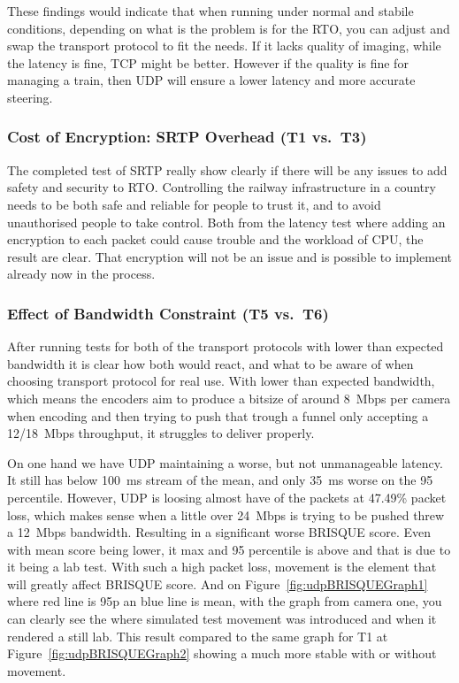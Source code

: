 These findings would indicate that when running under normal and stabile conditions, depending on what is the problem is for the RTO, you can adjust and swap the transport protocol to fit the needs. If it lacks quality of imaging, while the latency is fine, TCP might be better. However if the quality is fine for managing a train, then UDP will ensure a lower latency and more accurate steering.

\subsubsection{Cost of Encryption: SRTP Overhead (T1 vs.\ T3)}\label{subsubsec:srtp}

The completed test of SRTP really show clearly if there will be any issues to add safety and security to RTO. Controlling the railway infrastructure in a country needs to be both safe and reliable for people to trust it, and to avoid unauthorised people to take control. Both from the latency test where adding an encryption to each packet could cause trouble and the workload of CPU, the result are clear. That encryption will not be an issue and is possible to implement already now in the process.

\subsubsection{Effect of Bandwidth Constraint (T5 vs.\ T6)}\label{subsubsec:bandwidthDiscussion}

After running tests for both of the transport protocols with lower than expected bandwidth it is clear how both would react, and what to be aware of when choosing transport protocol for real use. With lower than expected bandwidth, which means the encoders aim to produce a bitsize of around 8~Mbps per camera when encoding and then trying to push that trough a funnel only accepting a 12/18~Mbps throughput, it struggles to deliver properly. 

On one hand we have UDP maintaining a worse, but not unmanageable latency. It still has below 100~ms stream of the mean, and only 35~ms worse on the 95 percentile. However, UDP is loosing almost have of the packets at 47.49\% packet loss, which makes sense when a little over 24~Mbps is trying to be pushed threw a 12~Mbps bandwidth. Resulting in a significant worse BRISQUE score. Even with mean score being lower, it max and 95 percentile is above and that is due to it being a lab test. With such a high packet loss, movement is the element that will greatly affect BRISQUE score. And on Figure~\ref{fig:udpBRISQUEGraph1} where red line is 95p an blue line is mean, with the graph from camera one, you can clearly see the where simulated test movement was introduced and when it rendered a still lab. This result compared to the same graph for T1 at Figure~\ref{fig:udpBRISQUEGraph2} showing a much more stable with or without movement.

